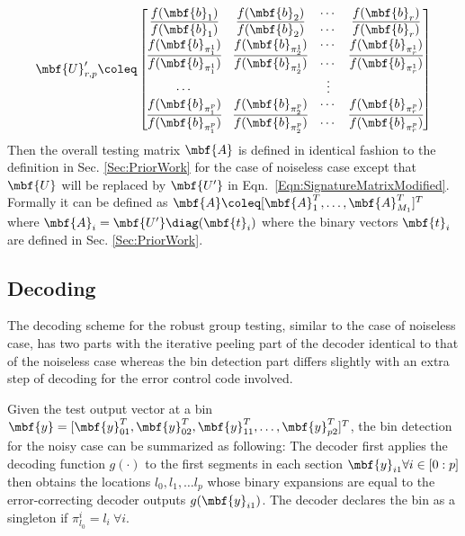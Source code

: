 \documentclass[conference,,twocolumn]{IEEEtran}
\begin{document}
 \begin{align}
\label{Eqn:SignatureMatrixModified}
\mbf{U}_{r,p}'\coleq\begin{bmatrix}
f(\mbf{b}_1)  & f(\mbf{b}_2) &\cdots & f(\mbf{b}_r) \\
\overline{f(\mbf{b}_1)} & \overline{f(\mbf{b}_2)} & \cdots & \overline{f(\mbf{b}_r)}\\
f(\mbf{b}_{\pi^{1}_{1}}) & f(\mbf{b}_{\pi^{1}_{2}}) & \cdots & f(\mbf{b}_{\pi^{1}_{r}})\\
\overline{f(\mbf{b}_{\pi^{1}_{1}})} & \overline{f(\mbf{b}_{\pi^{1}_{2}})} & \cdots & \overline{f(\mbf{b}_{\pi^{1}_{r}})}\\
\cdots &  &\vdots \\
f(\mbf{b}_{\pi^{p}_{1}}) & f(\mbf{b}_{\pi^{p}_{2}}) & \cdots & f(\mbf{b}_{\pi^{p}_{r}})\\
\overline{f(\mbf{b}_{\pi^{p}_{1}})} & \overline{f(\mbf{b}_{\pi^{p}_{2}})} & \cdots & \overline{f(\mbf{b}_{\pi^{p}_{r}})}\\
\end{bmatrix}
\end{align}  
Then the overall testing matrix $\mbf{A}$ is defined in identical fashion to the definition in Sec. \ref{Sec:PriorWork} for the case of noiseless case except that $\mbf{U}$ will be replaced by $\mbf{U'}$ in Eqn.~\eqref{Eqn:SignatureMatrixModified}. Formally it can be defined as $\mbf{A}\coleq [\mbf{A}_{1}^{T},\ldots,\mbf{A}_{M_{1}}^{T}]^T$ where $\mbf{A}_{i}=\mbf{U'} \diag (\mbf{t}_i)$ where the binary vectors $\mbf{t}_i$ are defined in Sec. \ref{Sec:PriorWork}. 

\subsection*{Decoding}
The decoding scheme for the robust group testing, similar to the case of noiseless case, has two parts with the iterative peeling part of the decoder identical to that of the noiseless case whereas the bin detection part differs slightly with an extra step of decoding for the error control code involved.

Given the test output vector at a bin $\mbf{y}=[\mbf{y}^{T}_{01},\mbf{y}^{T}_{02},\mbf{y}^{T}_{11},\ldots,\mbf{y}^{T}_{p2}]^T$, the bin detection for the noisy case can be summarized as following: The decoder first applies the decoding function $g(\cdot)$ to the first segments in each section $\mbf{y}_{i1} \forall i\in[0:p]$ then obtains the locations $l_0,l_1,\ldots l_p$ whose binary expansions are equal to the error-correcting decoder outputs $g(\mbf{y}_{i1})$. The decoder declares the bin as a singleton if $\pi_{l_0}^{i}=l_i~\forall i$.
\end{document}
